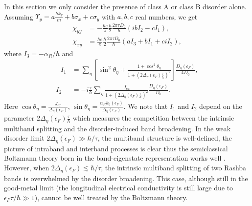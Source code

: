 \documentclass
[aps,pra,amsfonts,amssymb,twocolumn,amsmath,preprintnumbers,nofootinbib,floatfix,
showpacs,superscriptaddress]{revtex4-1}%
\begin{document}
In this section we only consider the presence of class A or class B disorder
alone. Assuming $\Upsilon_{y}=a\frac{\hbar k_{y}}{m}+b\sigma_{x}+c\sigma_{y}$
with $a,b,c$ real numbers, we get
\begin{align}
\chi_{yy}  &  =-\frac{\hbar e}{\pi}\frac{\hbar}{2}\frac{2\pi\tau D_{0}}{\hbar
}\left(  ibI_{2}-cI_{1}\right)  ,\nonumber\\
\chi_{xy}  &  =\frac{\hbar e}{\pi}\frac{\hbar}{2}\frac{2\pi\tau D_{0}}{\hbar
}\left(  aI_{3}+bI_{1}+ciI_{2}\right)  ,
\end{align}
where $I_{3}=-\alpha_{R}/\hbar$ and
\begin{align}
\text{\ }I_{1}  &  =\sum_{\eta}\left[  \sin^{2}\theta_{\eta}+\frac{1+\cos
^{2}\theta_{\eta}}{1+\left(  2\Delta_{\eta}\left(  \epsilon_{F}\right)
\frac{\tau}{\hbar}\right)  ^{2}}\right]  \frac{D_{\eta}\left(  \epsilon
_{F}\right)  }{4D_{0}},\nonumber\\
I_{2}  &  =-i\frac{\tau}{\hbar}\sum_{\eta}\frac{J_{ex}}{1+\left(
2\Delta_{\eta}\left(  \epsilon_{F}\right)  \frac{\tau}{\hbar}\right)  ^{2}%
}\frac{D_{\eta}\left(  \epsilon_{F}\right)  }{D_{0}}. \label{I-1}%
\end{align}
Here $\cos\theta_{\eta}=\frac{J_{ex}}{\Delta_{\eta}\left(  \epsilon
_{F}\right)  }$, $\sin\theta_{\eta}=\frac{\alpha_{R}k_{\eta}\left(
\epsilon_{F}\right)  }{\Delta_{\eta}\left(  \epsilon_{F}\right)  }$. We note
that $I_{1}$ and $I_{2}$ depend on the parameter $2\Delta_{\eta}\left(
\epsilon_{F}\right)  \frac{\tau}{\hbar}$ which measures the competition
between the intrinsic multiband splitting and the disorder-induced band
broadening. In the weak disorder limit $2\Delta_{\eta}\left(  \epsilon
_{F}\right)  \gg\hbar/\tau$, the multiband structure is well-defined, the
picture of intraband and interband processes is clear \cite{Kovalev2010} thus
the semiclassical Boltzmann theory born in the band-eigenstate representation
works well \cite{Xiao2017SOT}. However, when $2\Delta_{\eta}\left(
\epsilon_{F}\right)  \lesssim\hbar/\tau$, the intrinsic multiband splitting of
two Rashba bands is overwhelmed by the disorder broadening. This case,
although still in the good-metal limit (the longitudinal electrical
conductivity is still large due to $\epsilon_{F}\tau/\hbar\gg1$), cannot be
well treated by the Boltzmann theory.
\end{document}
